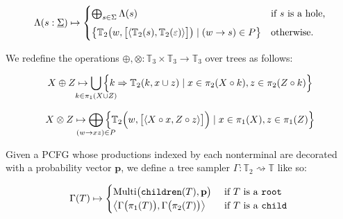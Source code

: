 \documentclass[portrait,a0b,final,a4resizeable]{a0poster}
\def\jointspacing{\vspace{0.3in}}
\begin{document}
\begin{poster}
\begin{multicols}{2}
      \[
           \Lambda(s: \underline\Sigma) \mapsto \begin{cases}
               \bigoplus_{s\in \Sigma} \Lambda(s) & \text{if $s$ is a hole,} \vspace{5pt}\\
               \big\{\mathbb{T}_2\big(w, \big[\langle\mathbb{T}_2(s), \mathbb{T}_2(\varepsilon)\rangle\big]\big) \mid (w \rightarrow s)\in P\big\} & \text{otherwise.}
           \end{cases}
      \]
%
      \hspace*{2cm}\begin{minipage}[c]{0.90\columnwidth}
      We redefine the operations $\oplus, \otimes: \mathbb{T}_3 \times \mathbb{T}_3 \rightarrow \mathbb{T}_3$ over trees as follows:
      \end{minipage}

      \[
          X \oplus Z \mapsto \bigcup_{\mathclap{k\in \pi_1(X \cup Z)}}\Big\{k \Rightarrow \mathbb{T}_2(k, x \cup z) \mid x \in \pi_2(X\circ k), z \in \pi_2(Z\circ k)\Big\}
      \]

      \[
        X \otimes Z \mapsto \bigoplus_{\mathclap{(w\rightarrow xz) \in P}}\Big\{\mathbb{T}_2\Big(w, \big[\langle X\circ x, Z\circ z\rangle\big]\Big) \mid x \in \pi_1(X), z \in \pi_1(Z)\Big\}
      \]
%

      \vspace{-0.5cm}
      \jointspacing


      \jointspacing

      \hspace*{2cm}\begin{minipage}[c]{0.90\columnwidth}
      Given a PCFG whose productions indexed by each nonterminal are decorated with a probability vector $\mathbf{p}$, we define a tree sampler $\Gamma: \mathbb{T}_2 \rightsquigarrow \mathbb{T}$ like so:
      \end{minipage}

      \begin{equation*}
        \Gamma(T) \mapsto \begin{cases}
                            \text{Multi} \big(\texttt{children}(T), \mathbf{p}\big) & \text{ if $T$ is a \texttt{root}} \\
                            \big\langle \Gamma\big(\pi_1(T)\big), \Gamma\big(\pi_2(T)\big) \big\rangle & \text{ if $T$ is a \texttt{child} }
        \end{cases}
      \end{equation*}



\end{multicols}
\end{poster}
\end{document}
